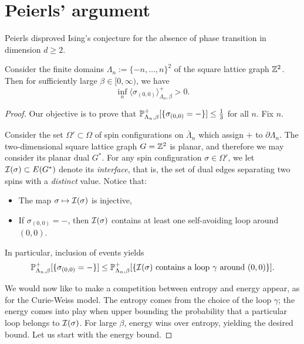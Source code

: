 \section{Peierls' argument}
\label{sec:peierls}

Peierls disproved Ising's conjecture for the absence of phase transition
in dimension $d\geq 2$.

\begin{theorem}[Peierls, 1936]
    \label{thm:peierls}
    Consider the finite domains $\Lambda_n:=\{-n,\dots,n\}^2$ of the square lattice graph $\Z^2$.
    Then for sufficiently large $\beta\in[0,\infty)$, we have
    \[
        \inf_n\langle\sigma_{(0,0)}\rangle_{\Lambda_n,\beta}^+>0.
    \]
\end{theorem}

\begin{proof}
    Our objective is to prove that $\P_{\Lambda_n,\beta}^+[\{\sigma_{(0,0)}=-\}]\leq\frac13$
    for all $n$.
    Fix $n$.

    Consider the set $\Omega'\subset\Omega$ of spin configurations on $\bar\Lambda_n$
    which assign $+$ to $\partial\Lambda_n$.
    The two-dimensional square lattice graph $G=\Z^2$ is planar, and
    therefore we may consider its planar dual $G^*$.
    For any spin configuration $\sigma\in\Omega'$,
    we let $\calI(\sigma)\subset E(G^*)$ denote its \emph{interface},
    that is, the set of dual edges separating two spins with a \emph{distinct} value.
    Notice that:
    \begin{itemize}
        \item The map $\sigma\mapsto \calI(\sigma)$ is injective,
        \item If $\sigma_{(0,0)}=-$, then $\calI(\sigma)$ contains at least one self-avoiding loop around $(0,0)$.
    \end{itemize}
    In particular, inclusion of events yields
    \begin{equation}
        \label{eq:peierlsgeneral}
        \P_{\Lambda_n,\beta}^+[\{\sigma_{(0,0)}=-\}]
        \leq
        \P_{\Lambda_n,\beta}^+[\{\text{$\calI(\sigma)$ contains a loop $\gamma$ around $(0,0)$}\}].
    \end{equation}

    We would now like to make a competition between entropy and energy appear,
    as for the Curie-Weiss model.
    The entropy comes from the choice of the loop $\gamma$;
    the energy comes into play when upper bounding the probability that a particular loop
    belongs to $\calI(\sigma)$.
    For large $\beta$, energy wins over entropy, yielding the desired bound.
    Let us start with the energy bound.


\end{proof}
